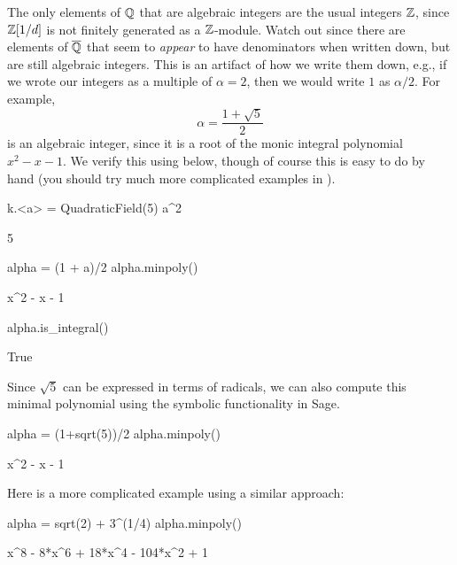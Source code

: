 The only elements of $\mathbb{Q}$ that are algebraic integers are the usual
integers $\mathbb{Z}$, since $\mathbb{Z}[1/d]$ is not finitely generated as a $\mathbb{Z}$-module.
Watch out since there are elements of $\overline{\mathbb{Q}}$ that seem to {\em appear}
to have denominators when written down, but are still algebraic integers.
This is an artifact of how we write them down, e.g., if we wrote
our integers as a multiple of $\alpha=2$, then we would write $1$
as $\alpha/2$. For example,
$$
  \alpha = \frac{1+\sqrt{5}}{2}
$$
is an algebraic integer, since it is a root of the monic integral
polynomial $x^2 - x - 1$.  We verify this using {\Sage} below,
though of course this is easy to do by hand (you should try
much more complicated examples in {\Sage}).

\begin{sagecode}
\begin{sagecell}
k.<a> = QuadraticField(5)
a^2
\end{sagecell}
\begin{sageout}
5
\end{sageout}
\begin{sagecell}
alpha = (1 + a)/2
alpha.minpoly()
\end{sagecell}
\begin{sageout}
x^2 - x - 1
\end{sageout}
\begin{sagecell}
alpha.is_integral()
\end{sagecell}
\begin{sageout}
True
\end{sageout}
\end{sagecode}

Since $\sqrt{5}$ can be expressed in terms of radicals, we can also
compute this minimal polynomial using the symbolic functionality in
Sage.
\begin{sagecode}
\begin{sagecell}
alpha = (1+sqrt(5))/2
alpha.minpoly()
\end{sagecell}
\begin{sageout}
x^2 - x - 1
\end{sageout}
Here is a more complicated example using a similar approach:
\begin{sagecell}
alpha = sqrt(2) + 3^(1/4)
alpha.minpoly()
\end{sagecell}
\begin{sageout}
x^8 - 8*x^6 + 18*x^4 - 104*x^2 + 1
\end{sageout}
\end{sagecode}

